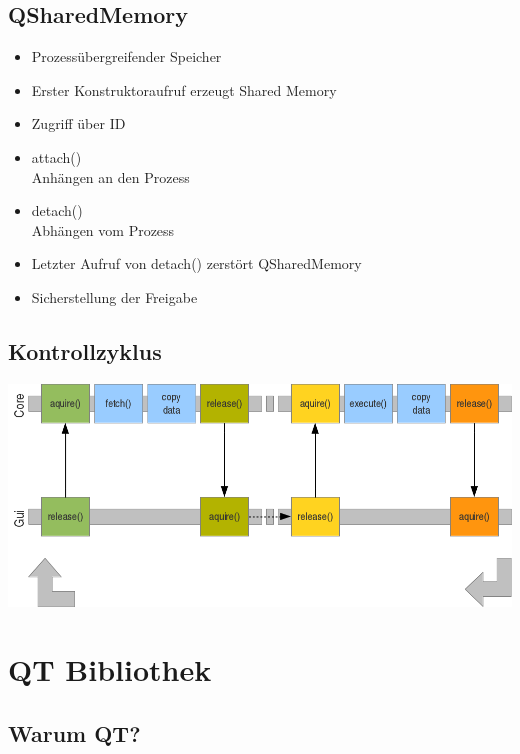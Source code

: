 \subsection{QSharedMemory}

\begin{frame}{\insertsubsection}
    \begin{itemize}
         \item Prozessübergreifender Speicher
         \item Erster Konstruktoraufruf erzeugt Shared Memory
         \item Zugriff über ID
         \item attach()\\
         Anhängen an den Prozess
         \item detach()\\
         Abhängen vom Prozess
         \item Letzter Aufruf von detach() zerstört QSharedMemory
         \item Sicherstellung der Freigabe
    \end{itemize}
\end{frame}

\subsection{Kontrollzyklus}
\begin{frame}{\insertsubsection}
    \includegraphics[width=\textwidth]{g2}
\end{frame}

\section{QT Bibliothek}

\subsection{Warum QT?}

